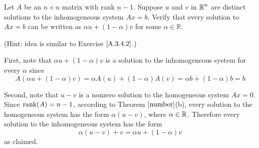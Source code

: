 \documentclass{ximera}
\begin{document}
\begin{exercise} \label{YZ_3.4.5}
Let $A$ be an $n\times n$ matrix with rank $n-1$.  Suppose $u$ and $v$ in $\mbox{$\mathbb{R}$}^n$ are distinct solutions to the inhomogeneous system $Ax = b$.  Verify that every solution to $Ax = b$ can be written as 
$\alpha u+(1-\alpha)v$ for some $\alpha\in \mathbb R$.

(Hint: idea is similar to Exercise $\ref{A.3.4.2}$.)

\begin{solution}

\soln 

First, note that $\alpha u+(1-\alpha)v$ is a solution to the inhomogeneous system for every $\alpha$ since
\[
A(\alpha u+(1-\alpha)v) = \alpha A(u) + (1-\alpha)A(v) =  \alpha b + (1-\alpha) b = b
\]

Second, note that $u-v$ is a nonzero solution to the homogeneous system $Ax = 0$.  Since ${\rm rank}(A) = n-1$, according to Theorem $\ref{number}$(b), every solution to the homogeneous system has the form $\alpha(u-v)$, where $\alpha\in\mbox{$\mathbb{R}$}$.  Therefore every solution to the inhomogeneous system has the form
\[
\alpha(u-v) + v = \alpha u + (1-\alpha) v
\]
as claimed.

\end{solution}
\end{exercise}
\end{document}
